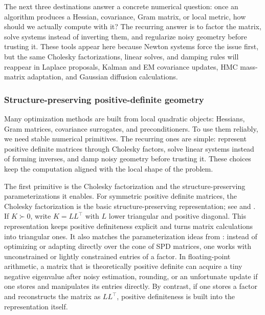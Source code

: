The next three destinations answer a concrete numerical question: once an algorithm produces a Hessian, covariance, Gram matrix, or local metric, how should we actually compute with it?
The recurring answer is to factor the matrix, solve systems instead of inverting them, and regularize noisy geometry before trusting it.
These tools appear here because Newton systems force the issue first, but the same Cholesky factorizations, linear solves, and damping rules will reappear in Laplace proposals, Kalman and EM covariance updates, HMC mass-matrix adaptation, and Gaussian diffusion calculations.

\subsubsection{Structure-preserving positive-definite geometry}
\label{subsec:geometry-control}
\label{subsubsec:cholesky-geometry}

Many optimization methods are built from local quadratic objects: Hessians, Gram matrices, covariance surrogates, and preconditioners.
To use them reliably, we need stable numerical primitives.
The recurring ones are simple: represent positive definite matrices through Cholesky factors, solve linear systems instead of forming inverses, and damp noisy geometry before trusting it.
These choices keep the computation aligned with the local shape of the problem.

The first primitive is the Cholesky factorization and the structure-preserving parameterizations it enables.
For symmetric positive definite matrices, the Cholesky factorization is the basic structure-preserving representation; see \citet[Thm.~4.2.7]{golub_van_loan_2013_matrix_computations} and \citet[Alg.~A.2]{nocedal_wright_2006_numerical}.
If $K\succ 0$, write $K=LL^\top$ with $L$ lower triangular and positive diagonal.
This representation keeps positive definiteness explicit and turns matrix calculations into triangular ones.
It also matches the parameterization ideas from : instead of optimizing or adapting directly over the cone of SPD matrices, one works with unconstrained or lightly constrained entries of a factor.
In floating-point arithmetic, a matrix that is theoretically positive definite can acquire a tiny negative eigenvalue after noisy estimation, rounding, or an unfortunate update if one stores and manipulates its entries directly.
By contrast, if one stores a factor and reconstructs the matrix as $LL^\top$, positive definiteness is built into the representation itself.

